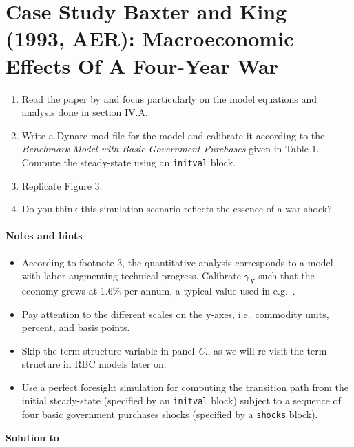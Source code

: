 \section[Case Study Baxter and King (1993, AER): Macroeconomic Effects Of A Four-Year War]{Case Study Baxter and King (1993, AER): Macroeconomic Effects Of A Four-Year War\label{ex:CaseStudy.BaxterKing.Figure3}}

\begin{enumerate}
\item
Read the paper by \textcite{Baxter.King_1993_FiscalPolicyGeneral}
  and focus particularly on the model equations and analysis done in section IV.A.

\item
Write a Dynare mod file for the model and calibrate it according to
  the \emph{Benchmark Model with Basic Government Purchases} given in Table 1.
Compute the steady-state using an \texttt{initval} block.

\item
Replicate Figure 3.

\item
Do you think this simulation scenario reflects the essence of a war shock?

\end{enumerate}

\paragraph{Notes and hints}

\begin{itemize}
\item
According to footnote 3, the quantitative analysis corresponds to a model with labor-augmenting technical progress.
Calibrate \(\gamma_X\) such that the economy grows at 1.6\% per annum,
  a typical value used in e.g.\ \textcite{King.Plosser.Rebelo_1988_ProductionGrowthBusiness}.

\item
Pay attention to the different scales on the y-axes,
  i.e.\ commodity units, percent, and basis points.

\item
Skip the term structure variable in panel \emph{C.},
  as we will re-visit the term structure in RBC models later on.

\item
Use a perfect foresight simulation for computing the transition path
  from the initial steady-state (specified by an \texttt{initval} block)
  subject to a sequence of four basic government purchases shocks
  (specified by a \texttt{shocks} block).

\end{itemize}

\begin{solution}\textbf{Solution to }
\ifDisplaySolutions%

\fi
\newpage
\end{solution}